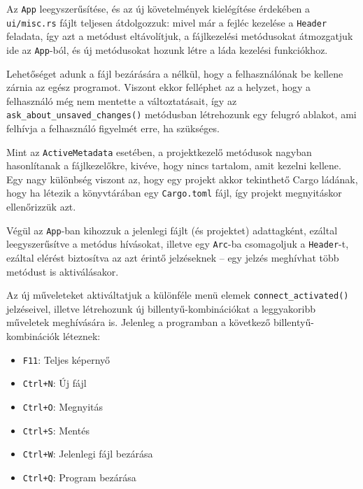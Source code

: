 
Az \texttt{App} leegyszerűsítése, és az új követelmények kielégítése érdekében a \texttt{ui/misc.rs}
fájlt teljesen átdolgozzuk: mivel már a fejléc kezelése a \texttt{Header} feladata,
így azt a metódust eltávolítjuk, a fájlkezelési metódusokat átmozgatjuk ide az \texttt{App}-ból,
és új metódusokat hozunk létre a láda kezelési funkciókhoz.



Lehetőséget adunk a fájl bezárására a nélkül, hogy a felhasználónak be kellene zárnia az egész programot.
Viszont ekkor felléphet az a helyzet, hogy a felhasználó még nem mentette a változtatásait,
így az \texttt{ask\_about\_unsaved\_changes()} metódusban létrehozunk egy felugró ablakot,
ami felhívja a felhasználó figyelmét erre, ha szükséges.

Mint az \texttt{ActiveMetadata} esetében, a projektkezelő metódusok nagyban hasonlítanak a fájlkezelőkre,
kivéve, hogy nincs tartalom, amit kezelni kellene.
Egy nagy különbség viszont az, hogy egy projekt akkor tekinthető Cargo ládának, hogy ha létezik a
könyvtárában egy \texttt{Cargo.toml} fájl, így projekt megnyitáskor ellenőrizzük azt.

Végül az \texttt{App}-ban kihozzuk a jelenlegi fájlt (és projektet) adattagként, 
ezáltal leegyszerűsítve a metódus hívásokat, illetve egy \texttt{Arc}-ba csomagoljuk
a \texttt{Header}-t, ezáltal elérést biztosítva az azt érintő jelzéseknek --
egy jelzés meghívhat több metódust is aktiválásakor.



Az új műveleteket aktiváltatjuk a különféle menü elemek \texttt{connect\_activated()} jelzéseivel,
illetve létrehozunk új billentyű-kombinációkat a leggyakoribb műveletek meghívására is.
Jelenleg a programban a következő billentyű-kombinációk léteznek:

\begin{itemize}
    \item \texttt{F11}: Teljes képernyő
    \item \texttt{Ctrl+N}: Új fájl
    \item \texttt{Ctrl+O}: Megnyitás
    \item \texttt{Ctrl+S}: Mentés
    \item \texttt{Ctrl+W}: Jelenlegi fájl bezárása
    \item \texttt{Ctrl+Q}: Program bezárása
\end{itemize}

